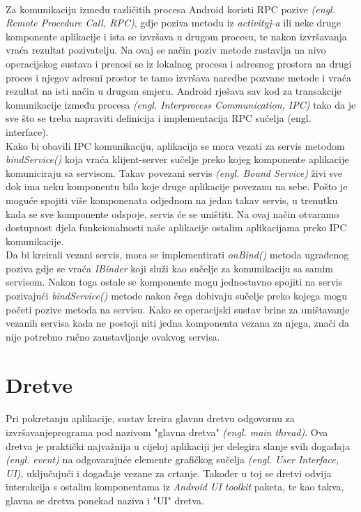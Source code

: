 \documentclass[times, utf8, zavrsni]{fer}
\begin{document}
\paragraph{}
Za komunikaciju između različitih procesa Android koristi RPC pozive \textit{(engl. Remote Procedure Call, RPC)}, gdje poziva metodu iz \textit{activityj-a} ili neke druge komponente aplikacije i ista se izvršava u drugom procesu, te nakon izvršavanja vraća rezultat pozivatelju. Na ovaj se način poziv metode rastavlja na nivo operacijskog sustava i prenosi se iz lokalnog procesa i adresnog prostora na drugi proces i njegov adresni prostor te tamo izvršava naredbe pozvane metode i vraća rezultat na isti način u drugom smjeru. Android rješava sav kod za transakcije komunikacije između procesa \textit{(engl. Interprocess Communication, IPC)} tako da je sve što se treba napraviti definicija i implementacija RPC sučelja (engl. interface).\\

Kako bi obavili IPC komunikaciju, aplikacija se mora vezati za servis metodom \textit{bindService()} koja vraća klijent-server sučelje preko kojeg komponente aplikacije komuniciraju sa servisom. Takav povezani servis \textit{(engl. Bound Service)} živi sve dok ima neku komponentu bilo koje druge aplikacije povezanu na sebe. Pošto je moguće spojiti više komponenata odjednom na jedan takav servis, u trenutku kada se sve komponente odspoje, servis će se uništiti. Na ovaj način otvaramo dostupnost djela funkcionalnosti naše aplikacije ostalim aplikacijama preko IPC komunikacije.\\

Da bi kreirali vezani servis, mora se implementirati \textit{onBind()} metoda ugrađenog poziva gdje se vraća \textit{IBinder} koji služi kao sučelje za komunikaciju sa samim servisom. Nakon toga ostale se komponente mogu jednostavno spojiti na servis pozivajući \textit{bindService()} metode nakon čega dobivaju sučelje preko kojega mogu početi pozive metoda na servisu. Kako se operacijski sustav brine za uništavanje vezanih servisa kada ne postoji niti jedna komponenta vezana za njega, znači da nije potrebno ručno zaustavljanje ovakvog servisa.
 
\section{Dretve}
\paragraph{}
Pri pokretanju aplikacije, sustav kreira glavnu dretvu odgovornu za izvršavanje\linebreak programa pod nazivom "glavna dretva" \textit{(engl. main thread)}. Ova dretva je praktički najvažnija u cijeloj aplikaciji jer delegira slanje svih događaja \textit{(engl. event)} na odgovarajuće elemente grafičkog sučelja \textit{(engl. User Interface, UI)}, uključujući i događaje vezane za crtanje. Također u toj se dretvi odvija interakcija s ostalim komponentama iz \textit{Android UI toolkit} paketa, te kao takva, glavna se dretva ponekad naziva i "UI" dretva.\\
\end{document}
